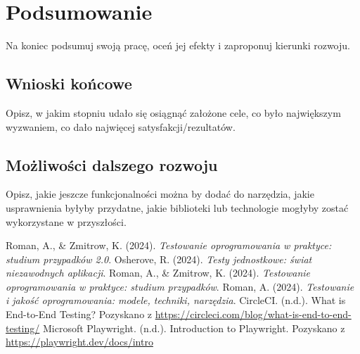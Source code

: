 \documentclass[12pt]{report}
\begin{document}
\chapter{Podsumowanie}
{Na koniec podsumuj swoją pracę, oceń jej efekty i zaproponuj kierunki rozwoju.}

\section{Wnioski końcowe}
{Opisz, w jakim stopniu udało się osiągnąć założone cele, co było największym wyzwaniem, co dało najwięcej satysfakcji/rezultatów.}

\section{Możliwości dalszego rozwoju}
{Opisz, jakie jeszcze funkcjonalności można by dodać do narzędzia, jakie usprawnienia byłyby przydatne, jakie biblioteki lub technologie mogłyby zostać wykorzystane w przyszłości.}

\begin{thebibliography}{9}
     Roman, A., \& Zmitrow, K. (2024). \textit{Testowanie oprogramowania w praktyce: studium przypadków 2.0}.
     Osherove, R. (2024). \textit{Testy jednostkowe: świat niezawodnych aplikacji}.
     Roman, A., \& Zmitrow, K. (2024). \textit{Testowanie oprogramowania w praktyce: studium przypadków}.
     Roman, A. (2024). \textit{Testowanie i jakość oprogramowania: modele, techniki, narzędzia}.
     CircleCI. (n.d.). What is End-to-End Testing? Pozyskano z \url{https://circleci.com/blog/what-is-end-to-end-testing/}
     Microsoft Playwright. (n.d.). Introduction to Playwright. Pozyskano z \url{https://playwright.dev/docs/intro}
\end{thebibliography}
\end{document}
